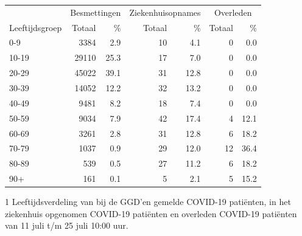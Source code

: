 \documentclass[
  english,
  man,floatsintext]{apa6}
\begin{document}
\begin{table}
\centering\begingroup\fontsize{11}{13}\selectfont

\begin{threeparttable}
\begin{tabular}{lrrrrrr}
\toprule
\multicolumn{1}{c}{ } & \multicolumn{2}{c}{Besmettingen} & \multicolumn{2}{c}{Ziekenhuisopnames} & \multicolumn{2}{c}{Overleden} \\
\cmidrule(l{3pt}r{3pt}){2-3} \cmidrule(l{3pt}r{3pt}){4-5} \cmidrule(l{3pt}r{3pt}){6-7}
Leeftijdsgroep & Totaal & \% & Totaal & \% & Totaal & \%\\
\midrule
0-9 & 3384 & 2.9 & 10 & 4.1 & 0 & 0.0\\
10-19 & 29110 & 25.3 & 17 & 7.0 & 0 & 0.0\\
20-29 & 45022 & 39.1 & 31 & 12.8 & 0 & 0.0\\
30-39 & 14052 & 12.2 & 32 & 13.2 & 0 & 0.0\\
40-49 & 9481 & 8.2 & 18 & 7.4 & 0 & 0.0\\
50-59 & 9034 & 7.9 & 42 & 17.4 & 4 & 12.1\\
60-69 & 3261 & 2.8 & 31 & 12.8 & 6 & 18.2\\
70-79 & 1037 & 0.9 & 29 & 12.0 & 12 & 36.4\\
80-89 & 539 & 0.5 & 27 & 11.2 & 6 & 18.2\\
90+ & 161 & 0.1 & 5 & 2.1 & 5 & 15.2\\
\bottomrule
\end{tabular}
\begin{tablenotes}
\item[1] Leeftijdsverdeling van bij de GGD’en gemelde COVID-19 patiënten, in het ziekenhuis opgenomen COVID-19 patiënten en overleden COVID-19 patiënten van 11 juli t/m 25 juli 10:00 uur.
\end{tablenotes}
\end{threeparttable}
\endgroup{}
\end{table}

\newpage
\end{document}
